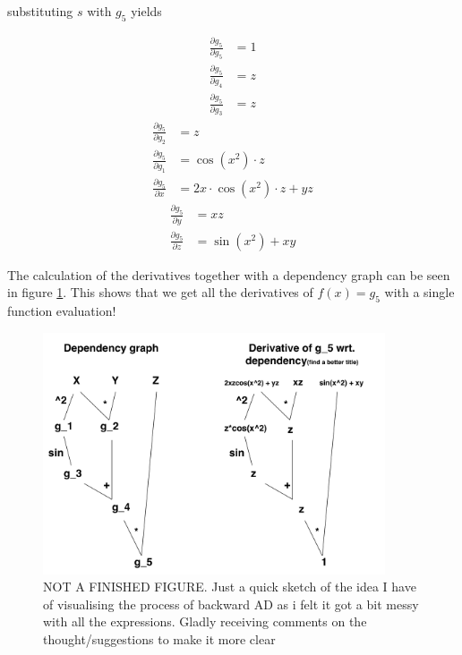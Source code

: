 substituting $s$ with $g_5$ yields
\begin{multicols}{3}
    \noindent
    \begin{align*}
        \frac{\partial g_5}{\partial g_5} &= 1\\
        \frac{\partial g_5}{\partial g_4} &= z\\
        \frac{\partial g_5}{\partial g_3} &= z
    \end{align*}
    \begin{align*}
        \frac{\partial g_5}{\partial g_2} &= z\\
        \frac{\partial g_5}{\partial g_1} &= \cos(x^2)\cdot z\\
        \frac{\partial g_5}{\partial x}   &= 2x\cdot\cos(x^2)\cdot z + yz
    \end{align*}
    \begin{align*}
        \frac{\partial g_5}{\partial y}   &= xz\\
        \frac{\partial g_5}{\partial z}   &= \sin(x^2)+xy
    \end{align*}
\end{multicols}
The calculation of the derivatives together with a dependency graph can be seen in figure \ref{fig:depency_graph_backward_AD}. This shows that we get all the derivatives of $f(x) = g_5$ with a single function evaluation!
\begin{figure}[htbp]
	\centering
	    \includegraphics[width=0.9\textwidth]{figures/dependency_graph_backward_AD.pdf}
	    \caption{NOT A FINISHED FIGURE. Just a quick sketch of the idea I have of visualising the process of backward AD as i felt it got a bit messy with all the expressions. Gladly receiving comments on the thought/suggestions to make it more clear}
	\label{fig:depency_graph_backward_AD}
\end{figure}
